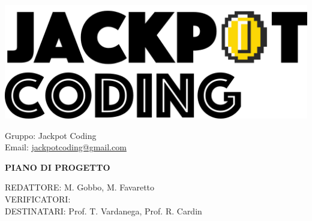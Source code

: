 \documentclass[5pt]{article}
\begin{document}
\begin{minipage}[t]{0.50\textwidth}
    \begin{flushleft}
        \hspace{10pt}
        \includegraphics[scale=0.65]{jackpot-logo.png} 
    \end{flushleft}
\end{minipage}
\hspace{-60pt} %
\begin{flushright}
    \begin{minipage}[t]{0.50\textwidth}
        \begin{flushright}
            Gruppo: {\Large Jackpot Coding}\\
            Email: \href{mailto:jackpotcoding@gmail.com}{jackpotcoding@gmail.com}
        \end{flushright}
    \end{minipage}
\end{flushright}

\vspace{24pt}

\begin{center}
    \textbf{\LARGE PIANO DI PROGETTO}
\end{center}

\vspace{13pt}

\begin{flushleft}
    \begin{spacing}{1.5}
        REDATTORE: M. Gobbo, M. Favaretto\\%
        VERIFICATORI: \\
        \vspace{7pt}
        DESTINATARI: Prof. T. Vardanega, Prof. R. Cardin\\%
    \end{spacing}
\end{flushleft}
\end{document}
